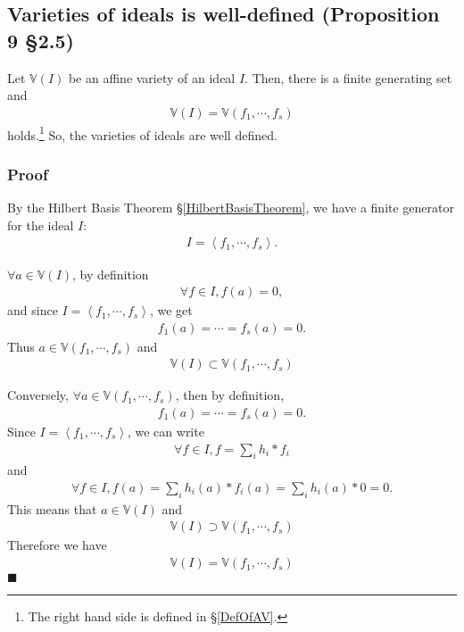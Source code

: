 \documentclass[11pt]{book}
\begin{document}
\subsection{Varieties of ideals is well-defined (Proposition 9 \S2.5)}
Let $\mathbb{V}(I)$ be an affine variety of an ideal $I$.
Then, there is a finite generating set and
\begin{eqnarray}
\mathbb{V}(I) = \mathbb{V}(f_1, \cdots, f_s)
\end{eqnarray}
holds.\footnote{The right hand side is defined in \S\ref{DefOfAV}.}
So, the varieties of ideals are well defined.

\subsubsection{Proof}
By the Hilbert Basis Theorem \S\ref{HilbertBasisTheorem}, we have a finite generator for the ideal $I$:
\begin{eqnarray}
I = \left< f_1, \cdots, f_s \right>.
\end{eqnarray}

$\forall a \in \mathbb{V}(I)$, by definition
\begin{eqnarray}
\forall f \in I, f(a) = 0,
\end{eqnarray}
and since $I = \left< f_1, \cdots, f_s \right>$, we get
\begin{eqnarray}
f_1(a) = \cdots = f_s(a) = 0.
\end{eqnarray}
Thus $a \in \mathbb{V}(f_1, \cdots, f_s)$ and
\begin{eqnarray}
\mathbb{V}(I) \subset \mathbb{V}(f_1, \cdots, f_s)
\end{eqnarray}

Conversely, $\forall a \in \mathbb{V}(f_1, \cdots, f_s)$, then by definition,
\begin{eqnarray}
f_1(a) = \cdots = f_s(a) = 0.
\end{eqnarray}
Since $I = \left< f_1, \cdots, f_s \right>$, we can write
\begin{eqnarray}
\forall f \in I, f = \sum_i h_i * f_i
\end{eqnarray}
and 
\begin{eqnarray}
\forall f \in I, f(a) = \sum_i h_i(a) * f_i(a) = \sum_i h_i(a) * 0 = 0.
\end{eqnarray}
This means that $a \in \mathbb{V}(I)$ and
\begin{eqnarray}
\mathbb{V}(I) \supset \mathbb{V}(f_1, \cdots, f_s)
\end{eqnarray}
Therefore we have
\begin{eqnarray}
\mathbb{V}(I) = \mathbb{V}(f_1, \cdots, f_s)
\end{eqnarray}
$\blacksquare$
\end{document}
